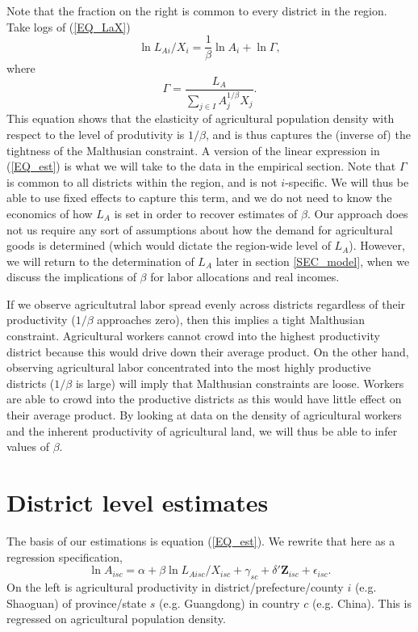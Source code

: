 \documentclass[11pt]{article}
\begin{document}
Note that the fraction on the right is common to every district in the region. Take logs of (\ref{EQ_LaX}) 
\begin{equation}
\ln L_{Ai}/X_i = \frac{1}{\beta} \ln A_{i} + \ln \Gamma, \label{EQ_est}
\end{equation}
where
\begin{equation}
    \Gamma = \frac{L_A}{\sum_{j\in I} A_{j}^{1/\beta}X_{j}}. \nonumber
\end{equation}
This equation shows that the elasticity of agricultural population density with respect to the level of produtivity is $1/\beta$, and is thus captures the (inverse of) the tightness of the Malthusian constraint. A version of the linear expression in (\ref{EQ_est}) is what we will take to the data in the empirical section. Note that $\Gamma$ is common to all districts within the region, and is not $i$-specific. We will thus be able to use fixed effects to capture this term, and we do not need to know the economics of how $L_A$ is set in order to recover estimates of $\beta$. Our approach does not us require any sort of assumptions about how the demand for agricultural goods is determined (which would dictate the region-wide level of $L_A$). However, we will return to the determination of $L_A$ later in section \ref{SEC_model}, when we discuss the implications of $\beta$ for labor allocations and real incomes.

If we observe agricultutral labor spread evenly across districts regardless of their productivity ($1/\beta$ approaches zero), then this implies a tight Malthusian constraint. Agricultural workers cannot crowd into the highest productivity district because this would drive down their average product. On the other hand, observing agricultural labor concentrated into the most highly productive districts ($1/\beta$ is large) will imply that Malthusian constraints are loose. Workers are able to crowd into the productive districts as this would have little effect on their average product. By looking at data on the density of agricultural workers and the inherent productivity of agricultural land, we will thus be able to infer values of $\beta$.

\section{District level estimates}
The basis of our estimations is equation (\ref{EQ_est}). We rewrite that here as a regression specification,
\begin{equation}
	\ln A_{isc} = \alpha + \beta \ln L_{Aisc}/X_{isc} + \gamma_{sc} + \delta' \mathbf{Z}_{isc} + \epsilon_{isc}. \label{EQ_regress}
\end{equation}
On the left is agricultural productivity in district/prefecture/county $i$ (e.g. Shaoguan) of province/state $s$ (e.g. Guangdong) in country $c$ (e.g. China). This is regressed on agricultural population density.
\end{document}
